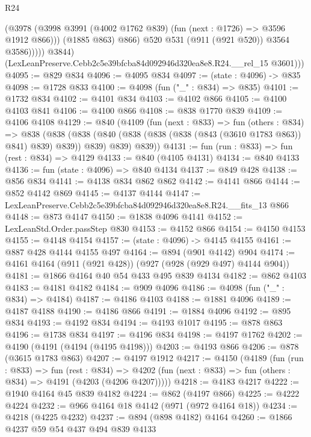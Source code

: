 \begin{lexlean}{R24}
\begin{coremodule}
                      (@3978
                        (@3998 @3991 (@4002 @1762 @839) (fun (next : @1726) => @3596 @1912 @866)))
                      (@1885 @863)
                      @866)
                    @520
                    @531
                    (@911 (@921 @520))
                    @3564
                    @3586)))))
          @3844)
        (LexLeanPreserve.Cebb2c5e39bfcba84d092946d320ea8e8.R24.__rel_15 @3601)))
@4095 := @829 @834
@4096 := @4095 @834
@4097 := (state : @4096) -> @835
@4098 := @1728 @833
@4100 := @4098 (fun ("_" : @834) => @835)
@4101 := @1732 @834
@4102 := @4101 @834
@4103 := @4102 @866
@4105 := @4100 @4103 @841
@4106 := @4100 @866
@4108 := @838 @1770 @839
@4109 := @4106 @4108
@4129 := @840
    (@4109
      (fun (next : @833) =>
      fun (others : @834) =>
      @838
        (@838 (@838 (@840 (@838 (@838 (@838 (@843 (@3610 @1783 @863)) @841) @839) @839)) @839) @839)
        @839))
@4131 := fun (run : @833) => fun (rest : @834) => @4129
@4133 := @840 (@4105 @4131)
@4134 := @840 @4133
@4136 := fun (state : @4096) => @840 @4134
@4137 := @849 @428
@4138 := @856 @834
@4141 := @4138 @834 @862 @862
@4142 := @4141 @866
@4144 := @852 @4142 @869
@4145 := @4137 @4144
@4147 := LexLeanPreserve.Cebb2c5e39bfcba84d092946d320ea8e8.R24.__fits_13 @866
@4148 := @873 @4147
@4150 := @1838 @4096 @4141
@4152 := LexLeanStd.Order.passStep @830
@4153 := @4152 @866
@4154 := @4150 @4153
@4155 := @4148 @4154
@4157 := (state : @4096) -> @4145 @4155
@4161 := @887 @428 @4144 @4155 @497
@4164 := @894 (@901 @4142) @904
@4174 := @4161 @4164 (@911 (@921 @428)) (@927 (@928 (@929 @497) @4144 @904))
@4181 := @1866 @4164 @40 @54 @433 @495 @839 @4134
@4182 := @862 @4103
@4183 := @4181 @4182
@4184 := @909 @4096
@4186 := @4098 (fun ("_" : @834) => @4184)
@4187 := @4186 @4103
@4188 := @1881 @4096
@4189 := @4187 @4188
@4190 := @4186 @866
@4191 := @1884 @4096
@4192 := @895 @834
@4193 := @4192 @834
@4194 := @4193 @1017
@4195 := @878 @863
@4196 := @1738 @834
@4197 := @4196 @834
@4198 := @4197 @1762
@4202 := @4190 (@4191 (@4194 (@4195 @4198)))
@4203 := @4193 @866
@4206 := @878 (@3615 @1783 @863)
@4207 := @4197 @1912
@4217 := @4150
    (@4189
      (fun (run : @833) =>
      fun (rest : @834) =>
      @4202 (fun (next : @833) => fun (others : @834) => @4191 (@4203 (@4206 @4207)))))
@4218 := @4183 @4217
@4222 := @1940 @4164 @45 @839 @4182
@4224 := @862 (@4197 @866)
@4225 := @4222 @4224
@4232 := @966 @4164 @18 @4142 (@971 (@972 @4164 @18))
@4234 := @4218 (@4225 @4232)
@4237 := @894 (@898 @4182) @4164
@4260 := @1866
    @4237
    @59
    @54
    @437
    @494
    @839
    @4133

\end{coremodule}
\end{lexlean}

